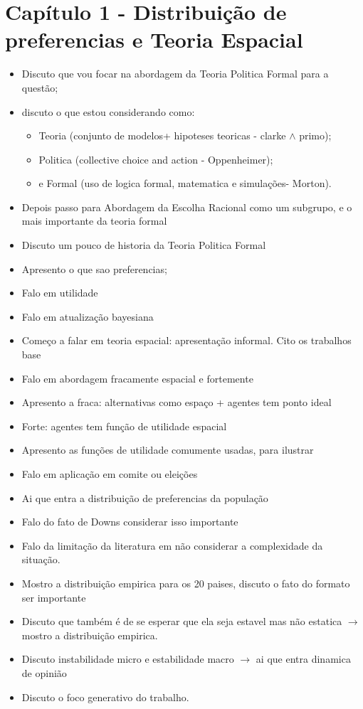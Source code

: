 \documentclass{article}
\begin{document}
\section*{Capítulo 1 - Distribuição de preferencias e Teoria Espacial }
\begin{itemize}
\item Discuto que vou focar na abordagem da Teoria Politica Formal para a
  questão;
\item discuto o que estou considerando como:
  \begin{itemize}
  \item Teoria (conjunto de modelos+ hipoteses teoricas - clarke $\land$ primo);
  \item Politica (collective choice and action - Oppenheimer); 
  \item e Formal (uso de logica formal, matematica e simulações- Morton).
\end{itemize}
\item Depois  passo para Abordagem da Escolha Racional como um subgrupo, e o
  mais importante da teoria formal
\item Discuto um pouco de historia da Teoria Politica Formal
\item Apresento o que sao preferencias;
\item Falo em utilidade
\item Falo em atualização bayesiana
\item Começo a falar em teoria espacial: apresentação informal. Cito os
  trabalhos base
\item Falo em abordagem fracamente espacial e fortemente
\item Apresento a fraca: alternativas como espaço + agentes tem ponto ideal
\item Forte: agentes tem função de utilidade espacial
\item Apresento as funções de utilidade comumente usadas, para ilustrar
\item Falo em aplicação em comite ou eleições 
\item Ai que entra a distribuição de preferencias da população
\item Falo do fato de Downs considerar isso importante
\item Falo da limitação da literatura em não considerar a complexidade da
  situação.
\item Mostro a distribuição empirica para os 20 paises, discuto o fato do
  formato ser importante
\item Discuto que também é de se esperar que ela seja estavel mas não estatica
  $\rightarrow$ mostro a distribuição empirica.
\item Discuto instabilidade micro e estabilidade macro $\rightarrow$ ai que entra dinamica
  de opinião 
\item Discuto o foco generativo do trabalho.
\end{itemize}
\end{document}
